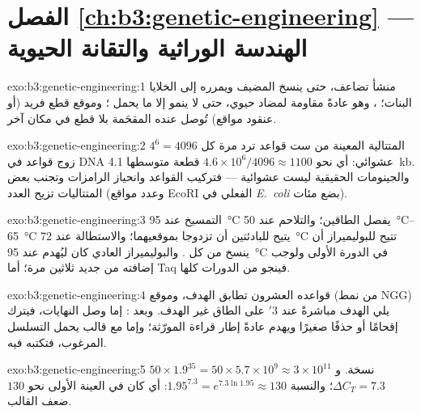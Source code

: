 \section*{الفصل \ref{ch:b3:genetic-engineering} --- الهندسة الوراثية والتقانة الحيوية}

\begin{solution}{exo:b3:genetic-engineering:1}
منشأ تضاعف، حتى ينسخ المضيف  ويمرره
إلى الخلايا البنات؛ ، وهو عادةً مقاومة لمضاد
حيوي، حتى لا ينمو إلا ما يحمل ؛ وموقع قطع
فريد (أو عنقود مواقع) تُوصل عنده المقحَمة
بلا قطع  في مكان آخر.
\end{solution}

\begin{solution}{exo:b3:genetic-engineering:2}
المتتالية المعينة من ست قواعد ترد مرة كل $4^{6} = 4096$ زوج قواعد في
DNA عشوائي: أي نحو $4.6\times 10^{6}/4096 \approx 1100$ قطعة متوسطها
\qty{4.1}{kb}. والجينومات الحقيقية ليست عشوائية --- فتركيب القواعد
وانحياز الرامزات وتجنب بعض المتتاليات تزيح العدد (وعدد
مواقع EcoRI الفعلي في \emph{E.~coli} بضع مئات).
\end{solution}

\begin{solution}{exo:b3:genetic-engineering:3}
التمسيخ عند \qty{95}{\celsius} يفصل الطاقين؛ والتلاحم عند
\qtyrange{50}{65}{\celsius} يتيح للبادئتين أن تزدوجا بموقعيهما؛
والاستطالة عند \qty{72}{\celsius} تتيح للبوليميراز أن ينسخ من كل
. والبوليميراز العادي كان ليُهدم عند \qty{95}{\celsius}
في الدورة الأولى ولوجب إضافته من جديد ثلاثين مرة؛ أما Taq
فينجو من الدورات كلها.
\end{solution}

\begin{solution}{exo:b3:genetic-engineering:4}
 قواعده العشرون تطابق الهدف، وموقع  (من نمط NGG)
يلي الهدف مباشرةً عند 3$'$ على الطاق غير الهدف. وبعد
: إما وصل النهايات، فيترك إقحامًا أو
حذفًا صغيرًا ويهدم عادةً إطار قراءة المورّثة؛ وإما  مع قالب يحمل التسلسل المرغوب، فتكتبه
فيه.
\end{solution}

\begin{solution}{exo:b3:genetic-engineering:5}
$50\times 1.9^{35} = 50\times 5.7\times 10^{9} \approx 3\times 10^{11}$
نسخة. و$\Delta C_{T} = 7.3$؛ والنسبة $1.95^{7.3} = e^{7.3\ln 1.95}
\approx 130$: أي كان في العينة الأولى نحو $130$ ضعف القالب.
\end{solution}

